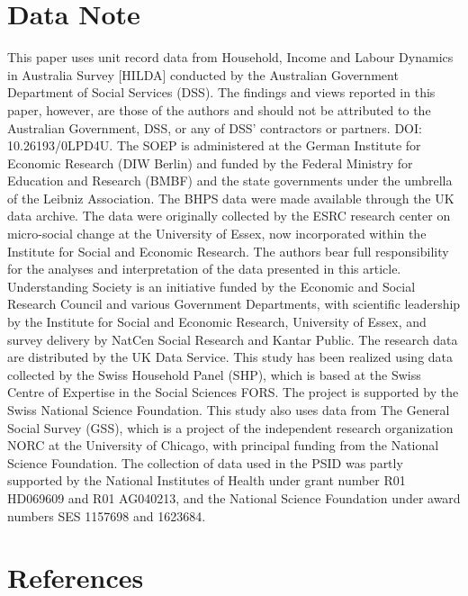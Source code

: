 \documentclass[
  11pt,
]{article}
\begin{document}
\section{Data Note}\label{data-note}

This paper uses unit record data from Household, Income and Labour
Dynamics in Australia Survey {[}HILDA{]} conducted by the Australian
Government Department of Social Services (DSS). The findings and views
reported in this paper, however, are those of the authors and should not
be attributed to the Australian Government, DSS, or any of DSS'
contractors or partners. DOI: 10.26193/0LPD4U. The SOEP is administered
at the German Institute for Economic Research (DIW Berlin) and funded by
the Federal Ministry for Education and Research (BMBF) and the state
governments under the umbrella of the Leibniz Association. The BHPS data
were made available through the UK data archive. The data were
originally collected by the ESRC research center on micro-social change
at the University of Essex, now incorporated within the Institute for
Social and Economic Research. The authors bear full responsibility for
the analyses and interpretation of the data presented in this article.
Understanding Society is an initiative funded by the Economic and Social
Research Council and various Government Departments, with scientific
leadership by the Institute for Social and Economic Research, University
of Essex, and survey delivery by NatCen Social Research and Kantar
Public. The research data are distributed by the UK Data Service. This
study has been realized using data collected by the Swiss Household
Panel (SHP), which is based at the Swiss Centre of Expertise in the
Social Sciences FORS. The project is supported by the Swiss National
Science Foundation. This study also uses data from The General Social
Survey (GSS), which is a project of the independent research
organization NORC at the University of Chicago, with principal funding
from the National Science Foundation. The collection of data used in the
PSID was partly supported by the National Institutes of Health under
grant number R01 HD069609 and R01 AG040213, and the National Science
Foundation under award numbers SES 1157698 and 1623684.

\section{References}\label{references}
\end{document}
